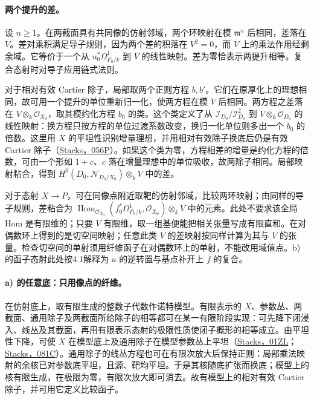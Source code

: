 \documentclass[openany,fontset=fandol]{ctexbook}
\newcommand{\OO}{\mathcal O}
\newcommand{\m}{\mathfrak m}
\newcommand{\Hom}{\operatorname{Hom}}
\begin{document}
\paragraph{两个提升的差。}
设 \(n\geq1\)。在两截面具有共同像的仿射邻域，两个环映射在模 \(\m^n\) 后相同，差落在 \(V\)。差对乘积满足导子规则，因为两个差的积落在 \(V^2=0\)，而 \(V\) 上的乘法作用经剩余域。它等价于一个从 \(u_0^*\Omega^1_{F_0/k}\) 到 \(V\) 的线性映射。差为零恰表示两提升相等。复合态射时对导子应用链式法则。

对于相对有效 Cartier 除子，局部取两个正则方程 \(b,b'\)。它们在原厚化上的理想相同，故可用一个提升的单位重新归一化，使两方程在模 \(V\) 后相同。两方程之差落在 \(V\otimes_k\OO_{X_0}\)，取其模约化方程 \(b_0\) 的类。这个类定义了从 \(\mathcal I_{D_0}/\mathcal I_{D_0}^2\) 到 \(V\otimes_k\OO_{D_0}\) 的线性映射：换方程只按方程的单位过渡系数改变，换归一化单位则多出一个 \(b_0\) 的倍数。这里用 \(X\) 的平坦性识别增量理想，并用相对有效除子换底后仍是有效 Cartier 除子（\href{https://stacks.math.columbia.edu/tag/056P}{Stacks，056P}）。如果这个类为零，方程相差的增量是约化方程的倍数，可由一个形如 \(1+c\)、\(c\) 落在增量理想中的单位吸收，故两除子相同。局部映射粘合，得到 \(H^0(D_0,\mathcal N_{D_0/X_0})\otimes_kV\) 中的差。

对于态射 \(X\to P\)，可在同像点附近取靶的仿射邻域，比较两环映射；由同样的导子规则，差粘合为 \(\Hom_{\OO_{X_0}}(f_0^*\Omega^1_{P_0/k},\OO_{X_0})\otimes_kV\) 中的元素。此处不要求该全局 Hom 是有限维的；只要 \(V\) 有限维，取一组基便能把相关张量写成有限直和。在对偶数环上得到的是切空间映射；任意此类 \(V\) 的差映射按同样计算为其与 \(V\) 的张量。检查切空间的单射须用纤维函子在对偶数环上的单射，不能改用域值点。b) 的函子态射此处按4.1解释为 \(u\) 的逆转置与基点补开上 \(f\) 的复合。

\paragraph{a) 的任意底：只用像点的纤维。}
在仿射底上，取有限生成的整数子代数作诺特模型。有限表示的 \(X\)、参数丛、两截面、通用除子及两截面所给除子的相等都可在某一有限阶段实现：可先降下闭浸入、线丛及其截面，再用有限表示态射的极限性质使闭子概形的相等成立。由平坦性下降，可使 \(X\) 在模型底上及通用除子在模型参数丛上平坦（\href{https://stacks.math.columbia.edu/tag/01ZL}{Stacks，01ZL}；\href{https://stacks.math.columbia.edu/tag/081C}{Stacks，081C}）。通用除子的线丛方程也可在有限次放大后保持正则：局部乘法映射的余核已对参数底平坦，且源、靶均平坦。于是其核随底扩张而换底；模型上的核有限生成，在极限为零，有限次放大即可消去。故有模型上的相对有效 Cartier 除子，并可用它定义比较函子。
\end{document}
